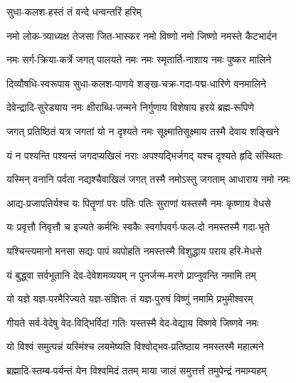 

{सुधा-कलश-हस्तं तं वन्दे धन्वन्तरिं हरिम्}


\twolineshloka
{नमो लोक-त्र्याध्यक्ष तेजसा जित-भास्कर}
{नमो विष्णो नमो जिष्णो नमस्ते कैटभार्दन}%

\twolineshloka
{नमः सर्ग-क्रिया-कर्त्रे जगत् पालयते नमः}
{नमः स्मृतार्ति-नाशाय नमः पुष्कर मालिने}%

\twolineshloka
{दिव्यौषधि-स्वरूपाय सुधा-कलश-पाणये}
{शङ्ख-चक्र-गदा-पद्म-धारिणे वनमालिने}%

\twolineshloka
{देवेन्द्रादि-सुरेड्याय नमः क्षीराब्धि-जन्मने}
{निर्गुणाय विशेषाय हरये ब्रह्म-रूपिणे}%

\twolineshloka
{जगत् प्रतिष्ठितं यत्र जगतां यो न दृश्यते}
{नमः सूक्ष्मातिसूक्ष्माय तस्मै देवाय शङ्खिने}%

\twolineshloka
{यं न पश्यन्ति पश्यन्तं जगदप्यखिलं नराः}
{अपश्यद्भिर्जगद् यश्च दृश्यते हृदि संस्थितः}%

\twolineshloka
{यस्मिन् वनानि पर्वता नद्यश्चैवाखिलं जगत्}
{तस्मै नमोऽस्तु जगताम् आधाराय नमो नमः}%

\twolineshloka
{आद्य-प्रजापतिर्यश्च यः पितॄणां परः पतिः}
{पतिः सुराणां यस्तस्मै नमः कृष्णाय वेधसे}%

\twolineshloka
{यः प्रवृत्तौ निवृत्तौ च इज्यते कर्मभिः स्वकैः}
{स्वर्गापवर्ग-फल-दो नमस्तस्मै गदा-भृते}%

\twolineshloka
{यश्चिन्त्यमानो मनसा सद्यः पापं व्यपोहति}
{नमस्तस्मै विशुद्धाय पराय हरि-मेधसे}%

\twolineshloka
{यं बुद्ध्वा सर्वभूतानि देव-देवेशमव्ययम्}
{न पुनर्जन्म-मरणे प्राप्नुवन्ति नमामि तम्}%

\twolineshloka
{यो यज्ञे यज्ञ-परमैरिज्यते यज्ञ-संज्ञितः}
{तं यज्ञ-पुरुषं विष्णुं नमामि प्रभुमीश्वरम्}%

\twolineshloka
{गीयते सर्व-वेदेषु वेद-विद्भिर्विदां गतिः}
{यस्तस्मै वेद-वेद्याय विष्णवे जिष्णवे नमः}%

\twolineshloka
{यो विश्वं समुत्पन्नं यस्मिंश्च लयमेष्यति}
{विश्वोद्भव-प्रतिष्ठाय नमस्तस्मै महात्मने}%

\twolineshloka
{ब्रह्मादि-स्तम्ब-पर्यन्तं येन विश्वमिदं ततम्}
{माया जालं समुत्तर्त्तं तमुपेन्द्रं नमाम्यहम्}%

